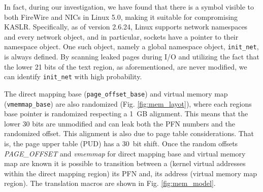 In fact, during our investigation, we have found that there is a symbol visible to both FireWire and NICs in Linux 5.0, making it suitable for compromising KASLR. Specifically, as of version 2.6.24, Linux supports network namespaces and every network object, and in particular, sockets have a pointer to their namespace object. One such object, namely a global namespace object, \texttt{init\_net}, is always defined. By scanning leaked pages during I/O and utilizing the fact that the lower 21 bits of the text region, as aforementioned, are never modified, we can identify \texttt{init\_net} with high probability.

The direct mapping base (\texttt{page\_offset\_base}) and virtual memory map (\texttt{vmemmap\_base}) are also randomized (Fig. \ref{fig:mem_layot}), where each regions base pointer is randomized respecting a 1~GB alignment. This means that the lower 30 bits are unmodified and can leak both the PFN numbers and the randomized offset. This alignment is also due to page table considerations. That is, the page upper table (PUD) has a 30~bit shift. Once the random offsets \textit{PAGE\_OFFSET} and \textit{vmemmap} for direct mapping base and virtual memory map are known it is possible to transition between a \kva{} (kernel virtual addresses within the direct mapping region) its PFN and, its \page{} address (virtual memory map region). The translation macros are shown in Fig. \ref{fig:mem_model}. 

